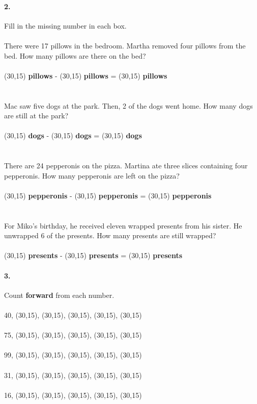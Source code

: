 \documentclass[12pt]{article}
\begin{document}
\paragraph{2.}
Fill in the missing number in each box. \\
\\
There were 17 pillows in the bedroom. Martha removed four pillows from the bed. How many pillows are there on the bed?
\\
\\
\framebox(30,15){} \textbf{pillows} - \framebox(30,15){} \textbf{pillows} = \framebox(30,15){} \textbf{pillows}
\\
\\
\\
Mac saw five dogs at the park. Then, 2 of the dogs went home. How many dogs are still at the park?
\\
\\
\framebox(30,15){} \textbf{dogs} - \framebox(30,15){} \textbf{dogs} = \framebox(30,15){} \textbf{dogs}
\\
\\
\\
There are 24 pepperonis on the pizza. Martina ate three slices containing four pepperonis. How many pepperonis are left on the pizza?
\\
\\
\framebox(30,15){} \textbf{pepperonis} - \framebox(30,15){} \textbf{pepperonis} = \framebox(30,15){} \textbf{pepperonis}
\\
\\
\\
For Miko's birthday, he received eleven wrapped presents from his sister. He unwrapped 6 of the presents. How many presents are still wrapped?
\\
\\
\framebox(30,15){} \textbf{presents} - \framebox(30,15){} \textbf{presents} = \framebox(30,15){} \textbf{presents}

\newpage

\paragraph{3.}
Count \textbf{forward} from each number. \\
\\
40, \framebox(30,15){}, \framebox(30,15){}, \framebox(30,15){}, \framebox(30,15){}, \framebox(30,15){}
\\
\\
75, \framebox(30,15){}, \framebox(30,15){}, \framebox(30,15){}, \framebox(30,15){}, \framebox(30,15){}
\\
\\
99, \framebox(30,15){}, \framebox(30,15){}, \framebox(30,15){}, \framebox(30,15){}, \framebox(30,15){}
\\
\\
31, \framebox(30,15){}, \framebox(30,15){}, \framebox(30,15){}, \framebox(30,15){}, \framebox(30,15){}
\\
\\
16, \framebox(30,15){}, \framebox(30,15){}, \framebox(30,15){}, \framebox(30,15){}, \framebox(30,15){}
\end{document}
